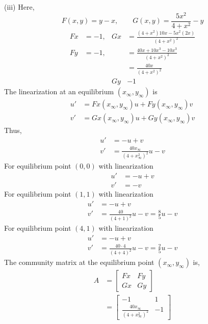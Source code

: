 \documentclass[../main-sheet.tex]{subfiles}
\begin{document}
\begin{soln}
    (iii) Here, \[F(x,y)=y-x,\qquad G(x,y)=\frac{5x^2}{4+x^2}-y\]
    \begin{align*}
        Fx&=-1, & Gx&=\frac{(4+x^2)10x-5x^2(2x)}{(4+x^2)^2}\\
        Fy&=-1, & &=\frac{40x+10x^3-10x^3}{(4+x^2)^2}\\
        & & &=\frac{40x}{(4+x^2)^2}\\
        & & Gy&-1
    \end{align*}
    The linearization at an equilibrium \((x_{\infty},y_\infty)\) is
    \begin{align*}
        u'&=Fx(x_\infty,y_\infty)u+Fy(x_\infty,y_\infty)v\\
        v'&=Gx(x_\infty,y_\infty)u+Gy(x_\infty,y_\infty)v
    \end{align*}
    Thus,
    \begin{align*}
        u'&=-u+v\\
        v'&=\frac{40x_\infty}{(4+x_\infty^2)^2}u-v
    \end{align*}
    For equilibrium point \((0,0)\) with linearization
    \begin{align*}
        u'&=-u+v\\
        v'&=-v
    \end{align*}
    For equilibrium point \((1,1)\) with linearization
    \begin{align*}
        u'&=-u+v\\
        v'&=\frac{40}{(4+1)^2}u-v=\frac{8}{5}u-v
    \end{align*}
    For equilibrium point \((4,1)\) with linearization
    \begin{align*}
        u'&=-u+v\\
        v'&=\frac{40\cdot 4}{(4+4)^2}u-v=\frac{2}{5}u-v
    \end{align*}
    The community matrix at the equilibrium point \((x_\infty,y_\infty)\) is,
    \begin{align*}
        A&=\begin{bmatrix}
            Fx & Fy \\
            Gx & Gy
        \end{bmatrix}\\
        &=\begin{bmatrix}
            -1 & 1 \\
            \displaystyle\frac{40x_\infty}{(4+x_\infty^2)^2} & -1
        \end{bmatrix}
    \end{align*}


\end{soln}
\end{document}
